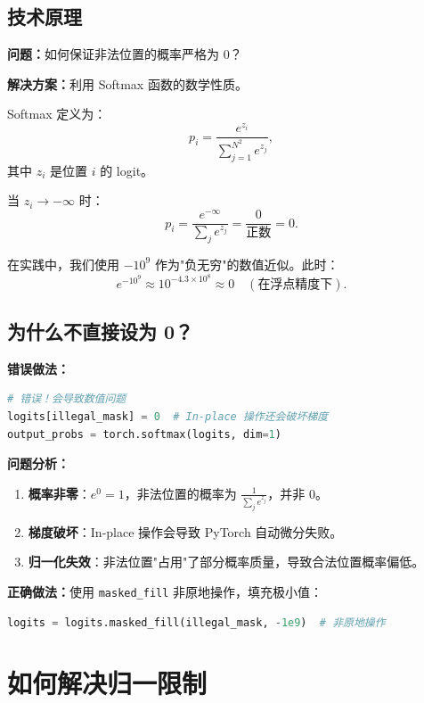 \documentclass[oneside]{ctexbook}
\begin{document}
\subsection{技术原理}

\textbf{问题：}如何保证非法位置的概率严格为 0？

\textbf{解决方案：}利用 Softmax 函数的数学性质。

Softmax 定义为：
\begin{equation}
p_i = \frac{e^{z_i}}{\sum_{j=1}^{N^2} e^{z_j}},
\end{equation}
其中 $z_i$ 是位置 $i$ 的 logit。

当 $z_i \to -\infty$ 时：
\begin{equation}
p_i = \frac{e^{-\infty}}{\sum_j e^{z_j}} = \frac{0}{\text{正数}} = 0.
\end{equation}

在实践中，我们使用 $-10^9$ 作为"负无穷"的数值近似。此时：
\begin{equation}
e^{-10^9} \approx 10^{-4.3 \times 10^8} \approx 0 \quad (\text{在浮点精度下}).
\end{equation}

\subsection{为什么不直接设为 0？}

\textbf{错误做法：}
\begin{lstlisting}[language=Python]
# 错误！会导致数值问题
logits[illegal_mask] = 0  # In-place 操作还会破坏梯度
output_probs = torch.softmax(logits, dim=1)
\end{lstlisting}

\textbf{问题分析：}
\begin{enumerate}
    \item \textbf{概率非零}：$e^0 = 1$，非法位置的概率为 $\frac{1}{\sum_j e^{z_j}}$，并非 0。
    \item \textbf{梯度破坏}：In-place 操作会导致 PyTorch 自动微分失败。
    \item \textbf{归一化失效}：非法位置"占用"了部分概率质量，导致合法位置概率偏低。
\end{enumerate}

\textbf{正确做法：}使用 \texttt{masked\_fill} 非原地操作，填充极小值：
\begin{lstlisting}[language=Python]
logits = logits.masked_fill(illegal_mask, -1e9)  # 非原地操作
\end{lstlisting}

\section{如何解决归一限制}
\end{document}
